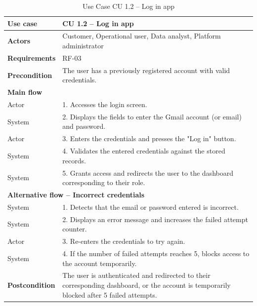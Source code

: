 \documentclass{article}
\begin{document}
\begin{table}[H]
\centering
\small
\renewcommand{\arraystretch}{1.35}
\caption{Use Case CU 1.2 -- Log in app}
\label{tab:cu1.2}
\begin{tabularx}{\textwidth}{|l|X|}
\hline
\textbf{Use case} & CU 1.2 -- Log in app \\ \hline
\textbf{Actors} & Customer, Operational user, Data analyst, Platform administrator \\ \hline
\textbf{Requirements} & RF-03 \\ \hline
\textbf{Precondition} & The user has a previously registered account with valid credentials. \\ \hline
\multicolumn{2}{|l|}{\textbf{Main flow}} \\ \hline
Actor & 1. Accesses the login screen. \\ \hline
System & 2. Displays the fields to enter the Gmail account (or email) and password. \\ \hline
Actor & 3. Enters the credentials and presses the "Log in" button. \\ \hline
System & 4. Validates the entered credentials against the stored records. \\ \hline
System & 5. Grants access and redirects the user to the dashboard corresponding to their role. \\ \hline
\multicolumn{2}{|l|}{\textbf{Alternative flow -- Incorrect credentials}} \\ \hline
System & 1. Detects that the email or password entered is incorrect. \\ \hline
System & 2. Displays an error message and increases the failed attempt counter. \\ \hline
Actor & 3. Re-enters the credentials to try again. \\ \hline
System & 4. If the number of failed attempts reaches 5, blocks access to the account temporarily. \\ \hline
\textbf{Postcondition} & The user is authenticated and redirected to their corresponding dashboard, or the account is temporarily blocked after 5 failed attempts. \\ \hline
\end{tabularx}
\end{table}
\end{document}

